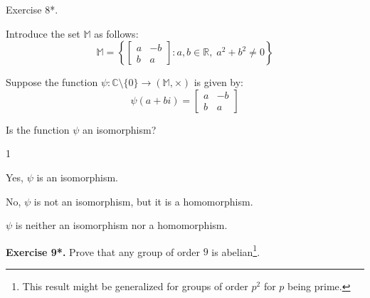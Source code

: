 \documentclass[../../book.tex]{subfiles}
\begin{document}
\begin{xexercise}
    {Exercise 8*.}
    {
        Introduce the set $\mathbb{M}$ as follows:
        \begin{equation*}
            \mathbb{M} = \left\{ \begin{bmatrix}
                a & -b \\ b & a
            \end{bmatrix}: a,b \in \mathbb{R}, \; a^2+b^2 \neq 0 \right\}
        \end{equation*}

        Suppose the function $\psi: \mathbb{C} \setminus \{0\} \to (\mathbb{M},\times)$ is given by:
        \begin{equation*}
            \psi(a+bi) = \begin{bmatrix}
                a & -b \\ b & a
            \end{bmatrix}
        \end{equation*}

        Is the function $\psi$ an isomorphism?
    }
    {1}
    {
        \item Yes, $\psi$ is an isomorphism.
        \item No, $\psi$ is not an isomorphism, but it is a homomorphism.
        \item $\psi$ is neither an isomorphism nor a homomorphism.
    }
\end{xexercise}

\textbf{Exercise 9*.} Prove that any group of order $9$ is abelian\footnote{This result might be generalized for groups of order $p^2$ for $p$ being prime.}.
\end{document}
